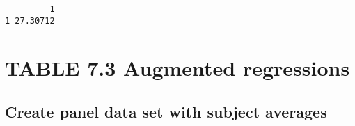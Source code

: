 \documentclass[]{book}
\begin{document}
\begin{verbatim}
         1
1 27.30712
\end{verbatim}

\hypertarget{table-7.3-augmented-regressions}{%
\section{TABLE 7.3 Augmented regressions}\label{table-7.3-augmented-regressions}}

\hypertarget{create-panel-data-set-with-subject-averages}{%
\subsection{Create panel data set with subject averages}\label{create-panel-data-set-with-subject-averages}}
\end{document}
